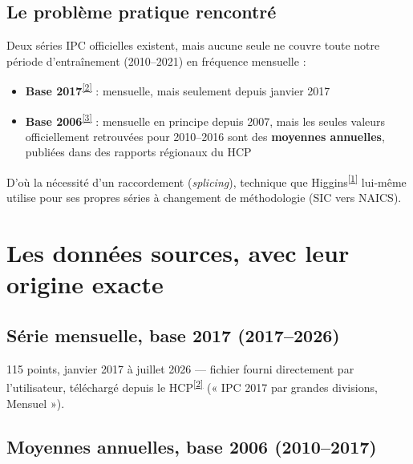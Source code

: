 \documentclass[11pt,a4paper]{article}
\newcommand{\cit}[1]{\textsuperscript{\hyperlink{ref#1}{[#1]}}}
\begin{document}
\subsection{Le problème pratique rencontré}

Deux séries IPC officielles existent, mais aucune seule ne couvre toute notre période d'entraînement (2010--2021) en fréquence mensuelle :
\begin{itemize}[leftmargin=1.3em]
\item \textbf{Base 2017}\cit{2} : mensuelle, mais seulement depuis janvier 2017
\item \textbf{Base 2006}\cit{3} : mensuelle en principe depuis 2007, mais les seules valeurs officiellement retrouvées pour 2010--2016 sont des \textbf{moyennes annuelles}, publiées dans des rapports régionaux du HCP
\end{itemize}

D'où la nécessité d'un raccordement (\emph{splicing}), technique que Higgins\cit{1} lui-même utilise pour ses propres séries à changement de méthodologie (SIC vers NAICS).

\section{Les données sources, avec leur origine exacte}

\subsection{Série mensuelle, base 2017 (2017--2026)}

\begin{fichebox}
115 points, janvier 2017 à juillet 2026 --- fichier fourni directement par l'utilisateur, téléchargé depuis le HCP\cit{2} (« IPC 2017 par grandes divisions, Mensuel »).
\end{fichebox}

\subsection{Moyennes annuelles, base 2006 (2010--2017)}
\end{document}
